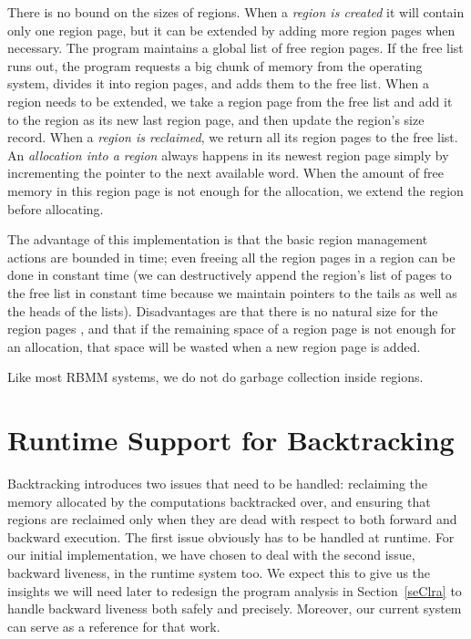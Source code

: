 \documentclass{tlp}
\begin{document}
There is no bound on the sizes of regions.
When a \emph{region is created} it will contain only one region page,
but it can be extended by adding more region pages when necessary.
The program maintains a global list of free region pages.
If the free list runs out,
the program requests a big chunk of memory from the operating system,
divides it into region pages, and adds them to the free list.
When a region needs to be extended,
we take a region page from the free list
and add it to the region as its new last region page,
and then update the region's size record.
When a \emph{region is reclaimed},
we return all its region pages to the free list.
An \emph{allocation into a region} always happens in its newest region page
simply by incrementing the pointer to the next available word.
When the amount of free memory in this region page
is not enough for the allocation,
we extend the region before allocating.

The advantage of this implementation is that
the basic region management actions are bounded in time;
even freeing all the region pages in a region can be done in constant time
(we can destructively append the region's list of pages
to the free list in constant time
because we maintain pointers to the tails as well as the heads of the lists).
Disadvantages are that
there is no natural size for the region pages \cite{Tofte04Retro},
and that if the remaining space of a region page
is not enough for an allocation,
that space will be wasted when a new region page is added.

Like most RBMM systems,
we do not do garbage collection inside regions.

\section{Runtime Support for Backtracking}
\label{seCsupportnondet}

Backtracking introduces two issues that need to be handled:
reclaiming the memory allocated by the computations backtracked over, and
ensuring that regions are reclaimed only when they are dead
with respect to both forward and backward execution.
The first issue obviously has to be handled at runtime.
For our initial implementation,
we have chosen to deal with the second issue, backward liveness,
in the runtime system too.
We expect this to give us the insights we will need later
to redesign the program analysis in Section~\ref{seClra}
to handle backward liveness both safely and precisely.
Moreover, our current system can serve as a reference for that work.
\end{document}
